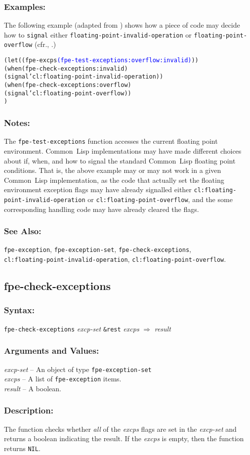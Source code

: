 \documentclass[10pt,fleqn]{article}
\newcommand{\CL}{\textsf{Common~Lisp}}
\newcommand{\code}[1]{\texttt{#1}}
\newcommand{\varname}[1]{\textit{#1}}
\newcommand{\DDictionaryItem}[1]{\vspace*{6pt}\noindent\hrulefill\vspace*{-9pt}\subsection*{#1}}
\newcommand{\DSyntax}{\subsubsection*{Syntax:}}
\newcommand{\DArgsNValues}{\subsubsection*{Arguments and Values:}}
\newcommand{\DDescription}{\subsubsection*{Description:}}
\newcommand{\DExamples}{\subsubsection*{Examples:}}
\newcommand{\DNotes}{\subsubsection*{Notes:}}
\newcommand{\DSeeAlso}{\subsubsection*{See Also:}}
\begin{document}
\DExamples{}

The following example (adapted from \cite{2018:C18}) shows how a piece of
code may decide how to \code{signal} either
\code{floating-point-invalid-operation} or
\code{floating-point-overflow} (cfr., \cite{1996:ANSIHyperSpec}.)

\begin{alltt}
(let ((fpe-excps \textcolor{blue}{(fpe-test-exceptions :overflow :invalid)}))
   (when (fpe-check-exceptions :invalid)
     (signal 'cl:floating-point-invalid-operation))
   (when (fpe-check-exceptions :overflow)
     (signal 'cl:floating-point-overflow))
   )
\end{alltt}

\DNotes{}

The \code{fpe-test-exceptions} function accesses the current floating
point environment.  \CL{} implementations may have made different
choices about if, when, and how to signal the standard \CL{} floating
point conditions.  That is, the above example may or may not work in a
given \CL{} implementation, as the code that actually set the floating
environment exception flags may have already signalled either
\code{cl:floating-point-invalid-operation} or
\code{cl:floating-point-overflow}, and the some corresponding handling
code may have already cleared the flags.

\DSeeAlso{}

\code{fpe-exception}, \code{fpe-exception-set},
\code{fpe-check-exceptions},\\
\code{cl:floating-point-invalid-operation},
\code{cl:floating-point-overflow}.





\DDictionaryItem{fpe-check-exceptions}

\DSyntax{}

\code{fpe-check-exceptions} \varname{excp-set} \code{\&rest} \varname{excps}
$\Rightarrow$ \varname{result}

\DArgsNValues{}

\varname{excp-set} -- An object of type \code{fpe-exception-set}\\
\varname{excps} -- A list of \code{fpe-exception} items.\\
\varname{result} -- A boolean.

\DDescription{}

The function checks whether \emph{all} of the \varname{excps} flags
are set in the \varname{excp-set} and returns a boolean indicating the
result.  If the \varname{excps} is empty, then the function returns
\code{NIL}.
\end{document}

